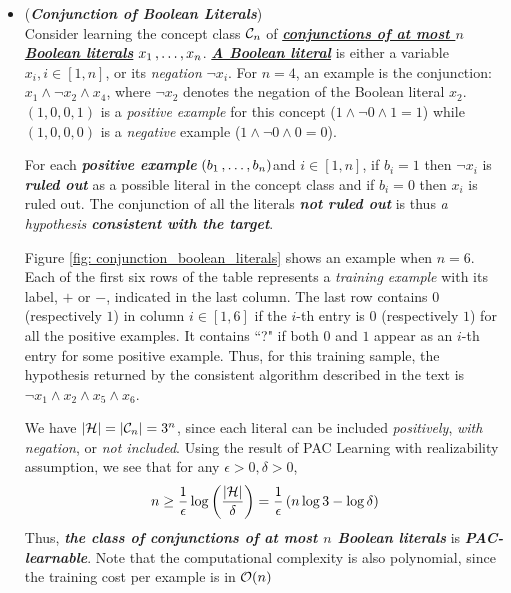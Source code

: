 \documentclass[11pt]{article}
\begin{document}
\begin{itemize}
\item \begin{example}(\emph{\textbf{Conjunction of Boolean Literals}}) \citep{mohri2018foundations}\\
Consider learning the concept class ${\mathcal C}_n$ of \underline{\emph{\textbf{conjunctions of at most $n$ Boolean literals}}} $x_1 \,{,}\ldots{,}\, x_n$. \underline{\emph{\textbf{A Boolean literal}}} is either a variable $x_i, i \in [1, n]$, or its \emph{negation} $\neg x_i$. For $n = 4$, an example is the conjunction: $x_1 \land \neg x_2 \land x_4$, where $\neg x_2$ denotes the negation of the Boolean literal $x_2$.  $(1, 0, 0, 1)$ is a \emph{positive example} for this concept ($1 \land \neg 0 \land 1 = 1$) while $(1, 0, 0, 0)$ is a \emph{negative} example ($1 \land \neg 0 \land 0 = 0 $).

\begin{remark} For each \emph{\textbf{positive example}} $(b_1 \,{,}\ldots{,}\, b_n)$and $i \in [1, n]$, if $b_i = 1$ then $\neg x_i$ is \emph{\textbf{ruled out}} as a possible literal in the concept class and if $b_i = 0$ then $x_i$ is ruled out. The conjunction of all the literals \emph{\textbf{not ruled out}} is thus \emph{a hypothesis \textbf{consistent with the target}}. 
\end{remark}

Figure \ref{fig: conjunction_boolean_literals} shows an example when $n = 6$. Each of the first six rows of the table represents a \emph{training example} with
its label, $+$ or $-$, indicated in the last column. The last row contains $0$ (respectively $1$) in column $i \in [1, 6]$ if the $i$-th entry is $0$ (respectively $1$) for all the positive examples. It contains ``?" if both $0$ and $1$ appear as an $i$-th entry for some positive example. Thus, for this training sample, the hypothesis returned by the consistent algorithm described in the text is $\neg x_1 \land x_2 \land x_5 \land x_6$.

We have $\left\lvert {\mathcal H} \right\rvert = \left\lvert {\mathcal C}_n \right\rvert = 3^n$, since each literal can be included \emph{positively}, \emph{with negation}, or \emph{not included}. Using the result of PAC Learning with realizability assumption, we see that for any $\epsilon > 0, \delta >0$, 
\begin{align*}
n \ge  \frac{1}{\epsilon}\log\left(\frac{\left\lvert {\mathcal H} \right\rvert}{\delta}\right) =  \frac{1}{\epsilon}\left(n\log3 - \log\delta\right) 
\end{align*} Thus, \emph{\textbf{the class of conjunctions of at most $n$ Boolean literals}} is \emph{\textbf{PAC-learnable}}. Note that the computational complexity is also polynomial, since the training cost per example is in ${\mathcal O}(n)$
\end{example}




\end{itemize}
\end{document}
